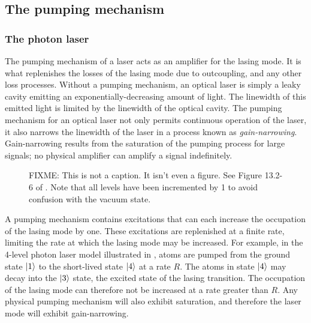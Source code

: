 \subsection{The pumping mechanism}

\subsubsection{The photon laser}

The pumping mechanism of a laser acts as an amplifier for the lasing mode.  It is what replenishes the losses of the lasing mode due to outcoupling, and any other loss processes.  Without a pumping mechanism, an optical laser is simply a leaky cavity emitting an exponentially-decreasing amount of light.  The linewidth of this emitted light is limited by the linewidth of the optical cavity.  The pumping mechanism for an optical laser not only permits continuous operation of the laser, it also narrows the linewidth of the laser in a process known as \emph{gain-narrowing}.  Gain-narrowing results from the saturation of the pumping process for large signals; no physical amplifier can amplify a signal indefinitely.  

\begin{figure}
    \centering
    \caption{
        \label{Introduction:4LevelOpticalLaserModel}
        FIXME: This is not a caption.  It isn't even a figure.  See Figure 13.2-6 of \citep{SalehTeich}.  Note that all levels have been incremented by 1 to avoid confusion with the vacuum state.
    }
\end{figure}

A pumping mechanism contains excitations that can each increase the occupation of the lasing mode by one.  These excitations are replenished at a finite rate, limiting the rate at which the lasing mode may be increased.  For example, in the 4-level photon laser model illustrated in , atoms are pumped from the ground state ${\left|1\right>}$ to the short-lived state ${\left|4\right>}$ at a rate $R$.  The atoms in state ${\left|4\right>}$ may decay into the ${\left|3\right>}$ state, the excited state of the lasing transition.  The occupation of the lasing mode can therefore not be increased at a rate greater than $R$.  Any physical pumping mechanism will also exhibit saturation, and therefore the laser mode will exhibit gain-narrowing.

